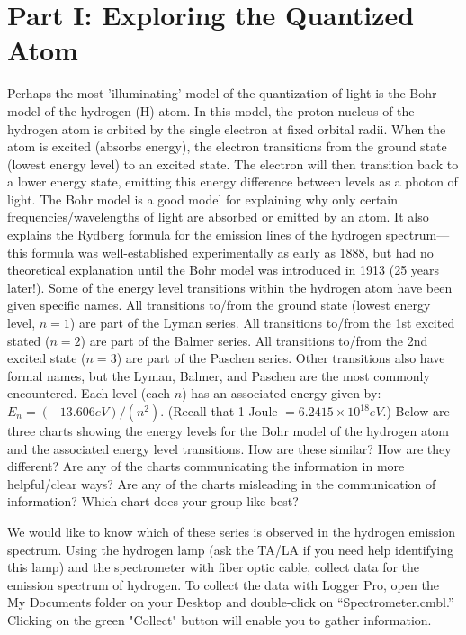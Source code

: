 \section*{Part I: Exploring the Quantized Atom}
Perhaps the most 'illuminating' model of the quantization of light is the Bohr model of the hydrogen (H) atom. 
In this model, the proton nucleus of the hydrogen atom is orbited by the single electron at fixed orbital radii. 
When the atom is excited (absorbs energy), the electron transitions from the ground state (lowest energy level) to an excited state. 
The electron will then transition back to a lower energy state, emitting this energy difference between levels as a photon of light. 
The Bohr model is a good model for explaining why only certain frequencies/wavelengths of light are absorbed or emitted by an atom. 
It also explains the Rydberg formula for the emission lines of the hydrogen spectrum—this formula was well-established experimentally as early as 1888, but had no theoretical explanation until the Bohr model was introduced in 1913 (25 years later!). 
Some of the energy level transitions within the hydrogen atom have been given specific names. 
All transitions to/from the ground state (lowest energy level, $n = 1$) are part of the Lyman series. 
All transitions to/from the 1st excited stated ($n = 2$) are part of the Balmer series. 
All transitions to/from the 2nd excited state ($n = 3$) are part of the Paschen series. 
Other transitions also have formal names, but the Lyman, Balmer, and Paschen are the most commonly encountered. 
Each level (each $n$) has an associated energy given by: $E_{n}=(-13.606 eV)/(n^{2})$. 
(Recall that 1 Joule $= 6.2415 \times 10^{18} eV$.) 
Below are three charts showing the energy levels for the Bohr model of the hydrogen atom and the associated energy level transitions. 
How are these similar? 
How are they different? 
Are any of the charts communicating the information in more helpful/clear ways? 
Are any of the charts misleading in the communication of information? 
Which chart does your group like best?
\par
We would like to know which of these series is observed in the hydrogen emission spectrum.
Using the hydrogen lamp (ask the TA/LA if you need help identifying this lamp) and the spectrometer with fiber optic cable, collect data for the emission spectrum of hydrogen. 
To collect the data with Logger Pro, open the My Documents folder on your Desktop and double-click on “Spectrometer.cmbl.” 
Clicking on the green "Collect" button will enable you to gather information.
